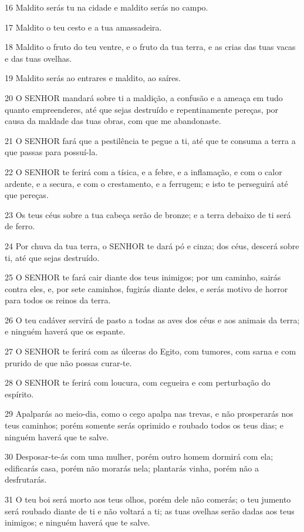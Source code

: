 \par 16 Maldito serás tu na cidade e maldito serás no campo.
\par 17 Maldito o teu cesto e a tua amassadeira.
\par 18 Maldito o fruto do teu ventre, e o fruto da tua terra, e as crias das tuas vacas e das tuas ovelhas.
\par 19 Maldito serás ao entrares e maldito, ao saíres.
\par 20 O SENHOR mandará sobre ti a maldição, a confusão e a ameaça em tudo quanto empreenderes, até que sejas destruído e repentinamente pereças, por causa da maldade das tuas obras, com que me abandonaste.
\par 21 O SENHOR fará que a pestilência te pegue a ti, até que te consuma a terra a que passas para possuí-la.
\par 22 O SENHOR te ferirá com a tísica, e a febre, e a inflamação, e com o calor ardente, e a secura, e com o crestamento, e a ferrugem; e isto te perseguirá até que pereças.
\par 23 Os teus céus sobre a tua cabeça serão de bronze; e a terra debaixo de ti será de ferro.
\par 24 Por chuva da tua terra, o SENHOR te dará pó e cinza; dos céus, descerá sobre ti, até que sejas destruído.
\par 25 O SENHOR te fará cair diante dos teus inimigos; por um caminho, sairás contra eles, e, por sete caminhos, fugirás diante deles, e serás motivo de horror para todos os reinos da terra.
\par 26 O teu cadáver servirá de pasto a todas as aves dos céus e aos animais da terra; e ninguém haverá que os espante.
\par 27 O SENHOR te ferirá com as úlceras do Egito, com tumores, com sarna e com prurido de que não possas curar-te.
\par 28 O SENHOR te ferirá com loucura, com cegueira e com perturbação do espírito.
\par 29 Apalparás ao meio-dia, como o cego apalpa nas trevas, e não prosperarás nos teus caminhos; porém somente serás oprimido e roubado todos os teus dias; e ninguém haverá que te salve.
\par 30 Desposar-te-ás com uma mulher, porém outro homem dormirá com ela; edificarás casa, porém não morarás nela; plantarás vinha, porém não a desfrutarás.
\par 31 O teu boi será morto aos teus olhos, porém dele não comerás; o teu jumento será roubado diante de ti e não voltará a ti; as tuas ovelhas serão dadas aos teus inimigos; e ninguém haverá que te salve.
